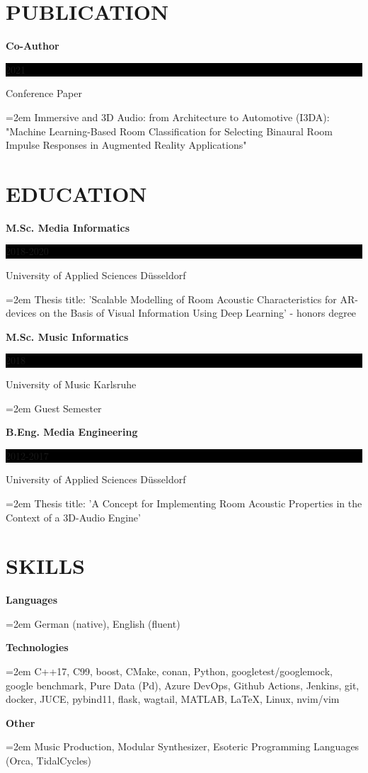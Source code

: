\documentclass[paper=a4,fontsize=11pt]{scrartcl}
\newcommand{\sepspace}{\vspace*{1em}}
\newcommand{\NewPart}[1]{\section*{\uppercase{#1}}}
\newcommand{\SkillsEntry}[4]{
		\noindent \textbf{#1} \hfill
		\colorbox{White}{\color{White}#2} \par
		\noindent #3 \par
		\noindent\hangindent=2em\hangafter=0 \small #4
		\normalsize \par}
\newcommand{\EducationEntry}[4]{
		\noindent \textbf{#1} \hfill
		\colorbox{Black}{
			\parbox{6em}{
			\hfill\color{White}#2}} \par
		\noindent #3 \par
		\noindent\hangindent=2em\hangafter=0 \small #4
		\normalsize \par}
\begin{document}
\NewPart{Publication}{}
\EducationEntry{Co-Author}{2021}{Conference Paper}{Immersive and 3D Audio: from Architecture to Automotive (I3DA): "Machine Learning-Based Room Classification for Selecting Binaural Room Impulse Responses in Augmented Reality Applications"}

\NewPart{Education}{}
\EducationEntry{M.Sc. Media Informatics}{2018-2020}{University of Applied Sciences Düsseldorf}{Thesis title: 'Scalable Modelling of Room Acoustic Characteristics for AR-devices on the Basis of Visual Information Using Deep Learning' - honors degree}
\sepspace
\EducationEntry{M.Sc. Music Informatics}{2018}{University of Music Karlsruhe}{Guest Semester}
\sepspace
\EducationEntry{B.Eng. Media Engineering}{2012-2017}{University of Applied Sciences Düsseldorf}{Thesis title: 'A Concept for Implementing Room Acoustic Properties in the Context of a 3D-Audio Engine'}

\NewPart{Skills}{}
\SkillsEntry{Languages}{}{}{German (native), English (fluent)}
\sepspace
\SkillsEntry{Technologies}{}{}{\textsc{C++17}, C99, boost, CMake, conan, Python, googletest/googlemock, google benchmark, Pure Data (Pd), Azure DevOps, Github Actions, Jenkins, git, docker, JUCE, pybind11, flask, wagtail, MATLAB, \LaTeX, Linux, nvim/vim}
\sepspace
\SkillsEntry{Other}{}{}{Music Production, Modular Synthesizer, Esoteric Programming Languages (Orca, TidalCycles)}
\end{document}
